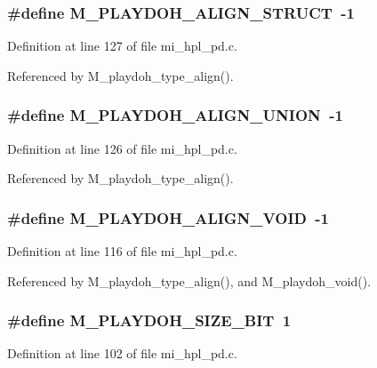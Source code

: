 \subsubsection{\setlength{\rightskip}{0pt plus 5cm}\#define M\_\-PLAYDOH\_\-ALIGN\_\-STRUCT~-1}\label{mi__hpl__pd_8c_e4335774db8d8a152f282b40302eef31}




Definition at line 127 of file mi\_\-hpl\_\-pd.c.

Referenced by M\_\-playdoh\_\-type\_\-align().
\subsubsection{\setlength{\rightskip}{0pt plus 5cm}\#define M\_\-PLAYDOH\_\-ALIGN\_\-UNION~-1}\label{mi__hpl__pd_8c_6dad3693b43034997b5a2cc91f11deb2}




Definition at line 126 of file mi\_\-hpl\_\-pd.c.

Referenced by M\_\-playdoh\_\-type\_\-align().
\subsubsection{\setlength{\rightskip}{0pt plus 5cm}\#define M\_\-PLAYDOH\_\-ALIGN\_\-VOID~-1}\label{mi__hpl__pd_8c_29fd3fa3b75eabd1cd82bcbf60b33285}




Definition at line 116 of file mi\_\-hpl\_\-pd.c.

Referenced by M\_\-playdoh\_\-type\_\-align(), and M\_\-playdoh\_\-void().
\subsubsection{\setlength{\rightskip}{0pt plus 5cm}\#define M\_\-PLAYDOH\_\-SIZE\_\-BIT~1}\label{mi__hpl__pd_8c_4531b24f92567ccc075799e29bda3c99}




Definition at line 102 of file mi\_\-hpl\_\-pd.c.

